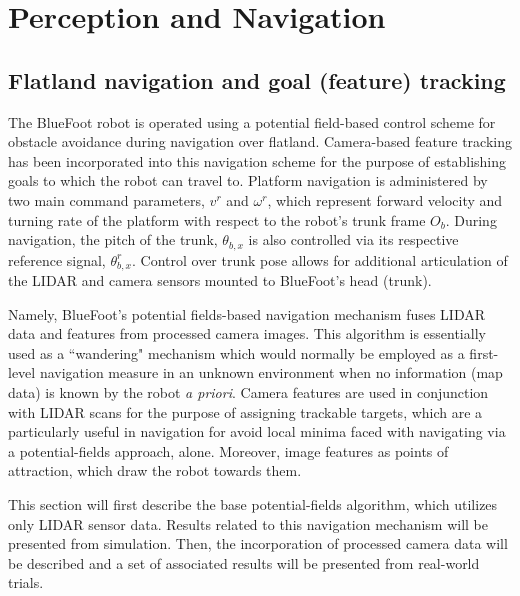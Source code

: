 \chapter{Perception and Navigation}
\label{ch::navigation}


	\section{Flatland navigation and goal (feature) tracking}
	
		The BlueFoot robot is operated using a potential field-based control scheme for obstacle avoidance during navigation over flatland. Camera-based feature tracking has been incorporated into this navigation scheme for the purpose of establishing goals to which the robot can travel to. Platform navigation is administered by two main command parameters, $v^{r}$ and $\omega^{r}$, which represent forward velocity and turning rate of the platform with respect to the robot's trunk frame $O_{b}$. During navigation, the pitch of the trunk, $\theta_{b,x}$ is also controlled via its respective reference signal, $\theta_{b,x}^{r}$. Control over trunk pose allows for additional articulation of the LIDAR and camera sensors mounted to BlueFoot's head (trunk). 

		Namely, BlueFoot's potential fields-based navigation mechanism fuses LIDAR data and features from processed camera images. This algorithm is essentially used as a ``wandering" mechanism which would normally be employed as a first-level navigation measure in an unknown environment when no information (\EG map data) is known by the robot \emph{a priori}. Camera features are used in conjunction with LIDAR scans for the purpose of assigning trackable targets, which are a particularly useful in navigation for avoid local minima faced with navigating via a potential-fields approach, alone. Moreover, image features as points of attraction, which draw the robot towards them. 

		This section will first describe the base potential-fields algorithm, which utilizes only LIDAR sensor data. Results related to this navigation mechanism will be presented from simulation. Then, the incorporation of processed camera data will be described and a set of associated results will be presented from real-world trials.

